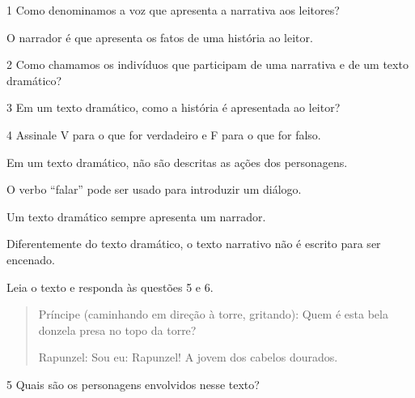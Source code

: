 
\num{1} Como denominamos a voz que apresenta a narrativa aos leitores?

\coment O narrador é que apresenta os fatos de uma história ao leitor.


\num{2} Como chamamos os indivíduos que participam de uma narrativa e de um
texto dramático?



\num{3} Em um texto dramático, como a história é apresentada ao leitor?



\num{4} Assinale V para o que for verdadeiro e F para o que for falso.

\begin{boxlist}
 Em um texto dramático, não são descritas as ações dos personagens.

 O verbo ``falar'' pode ser usado para introduzir um diálogo.

 Um texto dramático sempre apresenta um narrador.

 Diferentemente do texto dramático, o texto narrativo não é escrito para ser encenado.
\end{boxlist}

Leia o texto e responda às questões 5 e 6.

\begin{quote}
Príncipe (caminhando em direção à torre, gritando): Quem é esta bela
donzela presa no topo da torre?

Rapunzel: Sou eu: Rapunzel! A jovem dos cabelos dourados.
\end{quote}

\num{5} Quais são os personagens envolvidos nesse texto?




